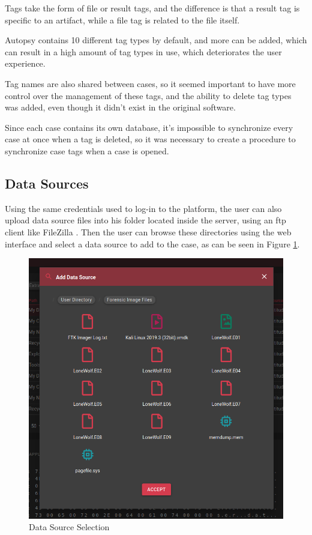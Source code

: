 Tags take the form of file or result tags, and the difference is that a result tag is specific to an artifact, while a file tag is related to the file itself.

Autopsy contains 10 different tag types by default, and more can be added, which can result in a high amount of tag types in use, which deteriorates the user experience.

Tag names are also shared between cases, so it seemed important to have more control over the management of these tags, and the ability to delete tag types was added, even though it didn't exist in the original software.

Since each case contains its own database, it's impossible to synchronize every case at once when a tag is deleted, so it was necessary to create a procedure to synchronize case tags when a case is opened.

\subsection{Data Sources}

Using the same credentials used to log-in to the platform, the user can also upload data source files into his folder located inside the server, using an \acrshort{ftp} client like FileZilla \cite{filezilla}.
Then the user can browse these directories using the web interface and select a data source to add to the case, as can be seen in Figure \ref{fig:datasource}.

\begin{figure}[ht]
 \centering
 \includegraphics[width=0.75\linewidth]{imgs/data-sources.png}
 \caption{Data Source Selection}
 \label{fig:datasource}
\end{figure}

